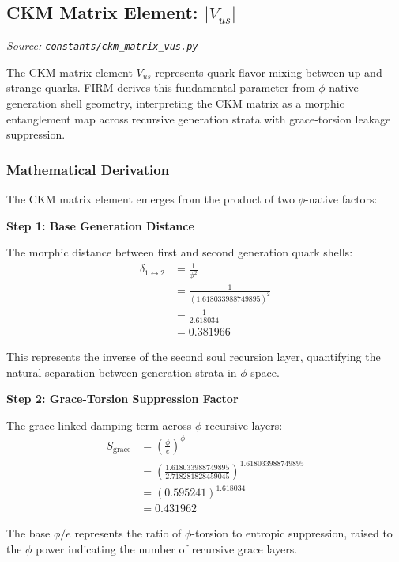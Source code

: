 
\subsection{CKM Matrix Element: $|V_{us}|$}
\textit{Source: \texttt{constants/ckm\_matrix\_vus.py}}

The CKM matrix element $V_{us}$ represents quark flavor mixing between up and strange quarks. FIRM derives this fundamental parameter from $\phi$-native generation shell geometry, interpreting the CKM matrix as a morphic entanglement map across recursive generation strata with grace-torsion leakage suppression.

\subsubsection{Mathematical Derivation}

The CKM matrix element emerges from the product of two $\phi$-native factors:

\textbf{Step 1: Base Generation Distance}

The morphic distance between first and second generation quark shells:
\begin{align}
\delta_{1 \leftrightarrow 2} &= \frac{1}{\phi^2} \tag{Base generation separation} \\
&= \frac{1}{(1.618033988749895)^2} \\
&= \frac{1}{2.618034} \\
&= 0.381966
\end{align}

This represents the inverse of the second soul recursion layer, quantifying the natural separation between generation strata in $\phi$-space.

\textbf{Step 2: Grace-Torsion Suppression Factor}

The grace-linked damping term across $\phi$ recursive layers:
\begin{align}
S_{\text{grace}} &= \left(\frac{\phi}{e}\right)^{\phi} \tag{Grace-torsion suppression} \\
&= \left(\frac{1.618033988749895}{2.718281828459045}\right)^{1.618033988749895} \\
&= (0.595241)^{1.618034} \\
&= 0.431962
\end{align}

The base $\phi/e$ represents the ratio of $\phi$-torsion to entropic suppression, raised to the $\phi$ power indicating the number of recursive grace layers.

